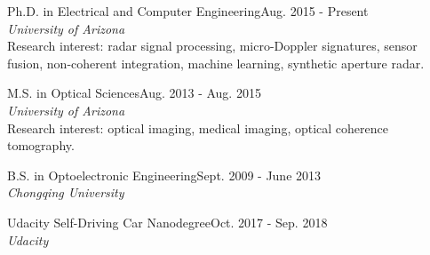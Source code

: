 \documentclass[letterpaper,9pt]{article}
\renewenvironment{itemize}{
  \begin{list}{}{
    \setlength{\topsep}{0pt}
    \setlength{\itemsep}{0pt}
    \setlength{\parsep}{0pt}
    \setlength{\partopsep}{0pt}
    \setlength{\leftmargin}{1.5em}
  }
}{\end{list}}
\begin{document}
\begin{itemize}
  \setlength{\itemsep}{1em}
  \item Ph.D. in Electrical and Computer Engineering\hfill Aug. 2015 - Present\\ {\it University of Arizona}\\Research interest: radar signal processing, micro-Doppler signatures, sensor fusion, non-coherent integration, machine learning, synthetic aperture radar.
  \item M.S. in Optical Sciences\hfill Aug. 2013 - Aug. 2015\\ {\it University of Arizona}\\Research interest: optical imaging, medical imaging, optical coherence tomography.
  \item B.S. in Optoelectronic Engineering\hfill Sept. 2009 - June 2013\\ {\it Chongqing University}
  \item Udacity Self-Driving Car Nanodegree\hfill Oct. 2017 - Sep. 2018\\ {\it Udacity}
\end{itemize}
\end{document}
